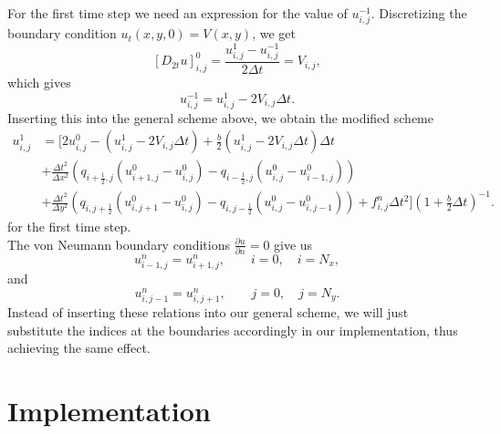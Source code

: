 \documentclass[paper=a4, fontsize=11pt]{article} %
\newcommand{\p}{\partial}
\begin{document}
For the first time step we need an expression for the value of $u^{-1}_{i,j}$. Discretizing the boundary condition $u_t(x,y,0)=V(x,y)$, we get
\[
[D_{2t}u]^0_{i,j}=\frac{u^{1}_{i,j}-u^{-1}_{i,j}}{2\Delta t}=V_{i,j},
\]
which gives
\[
u^{-1}_{i,j}=u^{1}_{i,j}-2V_{i,j}\Delta t.
\]
Inserting this into the general scheme above, we obtain the modified scheme
\begin{align*}
u^{1}_{i,j}&=\bigg[2u^{0}_{i,j}-(u^{1}_{i,j}-2V_{i,j}\Delta t)+\frac{b}{2}
	(u^{1}_{i,j}-2V_{i,j}\Delta t)\Delta t\\
&+\frac{\Delta t^2}{\Delta x^2}\left(q_{i+\frac{1}{2},j}(u^{0}_{i+1,j}-u^{0}_{i,j})
	-q_{i-\frac{1}{2},j}(u^{0}_{i,j}-u^{0}_{i-1,j})\right) \\
&+\frac{\Delta t^2}{\Delta y^2}\left(q_{i,j+\frac{1}{2}}(u^{0}_{i,j+1}-u^{0}_{i,j})
	-q_{i,j-\frac{1}{2}}(u^{0}_{i,j}-u^{0}_{i,j-1})\right) + f^n_{i,j}\Delta t^2\bigg](1+\frac{b}{2}\Delta t)^{-1}.
\end{align*}
for the first time step.\\

The von Neumann boundary conditions $\frac{\p u}{\p n}=0$ give us 
\[
u^{n}_{i-1,j}=u^{n}_{i+1,j},\quad\quad i=0,\quad i=N_x,
\]
and
\[
u^{n}_{i,j-1}=u^{n}_{i,j+1},\quad\quad j=0,\quad j=N_y.
\]
Instead of inserting these relations into our general scheme, we will just substitute the indices at the boundaries accordingly in our implementation, thus achieving the same effect.

\section{Implementation}
\end{document}
